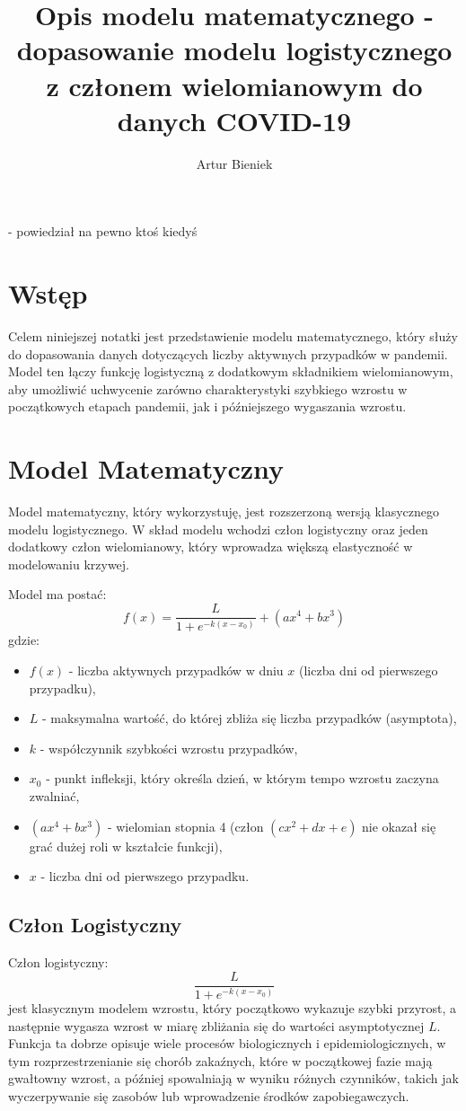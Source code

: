 \documentclass{article}
\title{Opis modelu matematycznego - dopasowanie modelu logistycznego z członem wielomianowym do danych COVID-19}
\author{}
\date{}
\begin{document}
\author{Artur Bieniek}
\maketitle

 - powiedział na pewno ktoś kiedyś

\section{Wstęp}
Celem niniejszej notatki jest przedstawienie modelu matematycznego, który służy do dopasowania danych dotyczących liczby aktywnych przypadków w pandemii. Model ten łączy funkcję logistyczną z dodatkowym składnikiem wielomianowym, aby umożliwić uchwycenie zarówno charakterystyki szybkiego wzrostu w początkowych etapach pandemii, jak i późniejszego wygaszania wzrostu.

\section{Model Matematyczny}

Model matematyczny, który wykorzystuję, jest rozszerzoną wersją klasycznego modelu logistycznego. W skład modelu wchodzi człon logistyczny oraz jeden dodatkowy człon wielomianowy, który wprowadza większą elastyczność w modelowaniu krzywej.

Model ma postać:
\[
f(x) = \frac{L}{1 + e^{-k(x - x_0)}} + (ax^4+bx^3)
\]
gdzie:
\begin{itemize}
    \item $f(x)$ - liczba aktywnych przypadków w dniu $x$ (liczba dni od pierwszego przypadku),
    \item $L$ - maksymalna wartość, do której zbliża się liczba przypadków (asymptota),
    \item $k$ - współczynnik szybkości wzrostu przypadków,
    \item $x_0$ - punkt infleksji, który określa dzień, w którym tempo wzrostu zaczyna zwalniać,
    \item $(ax^4+bx^3)$ - wielomian stopnia 4 (człon $(cx^2+dx+e)$ nie okazał się grać dużej roli w kształcie funkcji),
    \item $x$ - liczba dni od pierwszego przypadku.
\end{itemize}

\subsection{Człon Logistyczny}
Człon logistyczny:
\[
\frac{L}{1 + e^{-k(x - x_0)}}
\]
jest klasycznym modelem wzrostu, który początkowo wykazuje szybki przyrost, a następnie wygasza wzrost w miarę zbliżania się do wartości asymptotycznej $L$. Funkcja ta dobrze opisuje wiele procesów biologicznych i epidemiologicznych, w tym rozprzestrzenianie się chorób zakaźnych, które w początkowej fazie mają gwałtowny wzrost, a później spowalniają w wyniku różnych czynników, takich jak wyczerpywanie się zasobów lub wprowadzenie środków zapobiegawczych.
\end{document}

